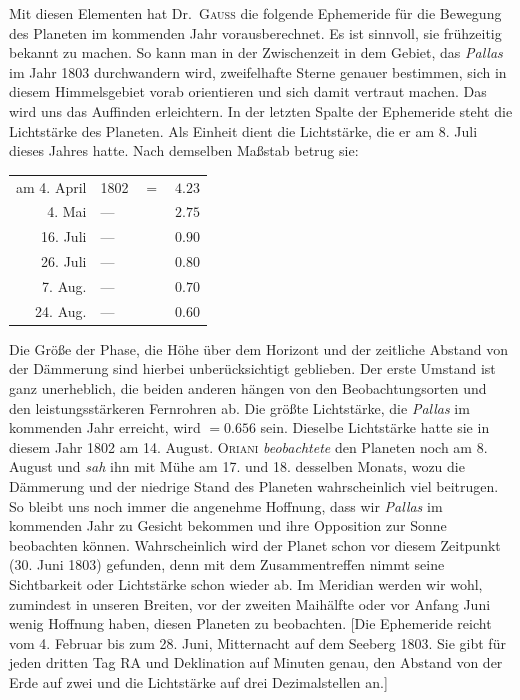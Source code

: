 Mit diesen Elementen hat Dr.\ \textsc{Gauß} die folgende Ephemeride für die Bewegung des Planeten im kommenden Jahr vorausberechnet. Es ist sinnvoll, sie frühzeitig bekannt zu machen. So kann man in der Zwischenzeit in dem Gebiet, das \textit{Pallas} im Jahr 1803 durchwandern wird, zweifelhafte Sterne genauer bestimmen, sich in diesem Himmelsgebiet vorab orientieren und sich damit vertraut machen. Das wird uns das Auffinden erleichtern. In der letzten Spalte der Ephemeride steht die Lichtstärke des Planeten. Als Einheit dient die Lichtstärke, die er am 8. Juli dieses Jahres hatte. Nach demselben Maßstab betrug sie:
\begin{center}
\begin{tabular}{r l l r}
am 4. April&1802&$=$&$4.23$\\
4. Mai&—&&$2.75$\\
16. Juli&—&&$0.90$\\
26. Juli&—&&$0.80$\\
7. Aug.&—&&$0.70$\\
24. Aug.&—&&$0.60$
\end{tabular}
\end{center}
Die Größe der Phase, die Höhe über dem Horizont und der zeitliche Abstand von der Dämmerung sind hierbei unberücksichtigt geblieben. Der erste Umstand ist ganz unerheblich, die beiden anderen hängen von den Beobachtungsorten und den leistungsstärkeren Fernrohren ab. Die größte Lichtstärke, die \textit{Pallas} im kommenden Jahr erreicht, wird $=0.656$ sein. Dieselbe Lichtstärke hatte sie in diesem Jahr 1802 am 14. August. \textsc{Oriani} \textit{beobachtete} den Planeten noch am 8. August und \textit{sah} ihn mit Mühe am 17. und 18. desselben Monats, wozu die Dämmerung und der niedrige Stand des Planeten wahrscheinlich viel beitrugen. So bleibt uns noch immer die angenehme Hoffnung, dass wir \textit{Pallas} im kommenden Jahr zu Gesicht bekommen und ihre Opposition zur Sonne beobachten können. Wahrscheinlich wird der Planet schon vor diesem Zeitpunkt (30. Juni 1803) gefunden, denn mit dem Zusammentreffen nimmt seine Sichtbarkeit oder Lichtstärke schon wieder ab. Im Meridian werden wir wohl, zumindest in unseren Breiten, vor der zweiten Maihälfte oder vor Anfang Juni wenig Hoffnung haben, diesen Planeten zu beobachten. [Die Ephemeride reicht vom 4. Februar bis zum 28. Juni, Mitternacht auf dem Seeberg 1803. Sie gibt für jeden dritten Tag RA und Deklination auf Minuten genau, den Abstand von der Erde auf zwei und die Lichtstärke auf drei Dezimalstellen an.]


